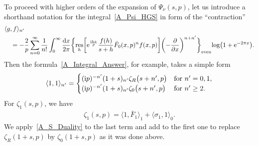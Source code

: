 \documentclass[pdftex]{sigma}
\numberwithin{equation}{section}
\DeclareMathOperator{\res}{res}
\begin{document}
To proceed with higher orders of the expansion of $\Psi_\nu(s, p)$, let us introduce a shorthand notation for the integral~\eqref{A_Psi_HGS} in form of the ``contraction''
\begin{align*}%
&\langle g, f \rangle_{n'} \\
&\quad{}=-\frac{2}{p} \sum_{n=0}^{\infty} \frac{1}{n!} \int_{0}^{\infty} \frac{{\rm d}x}{2\pi}
    \biggl\{
        \res_h\biggl[{\rm e}^{\frac{{\rm i}hx}{p}} \frac{f(h)}{s+h} \bar{F}_0(x, p)^n f(x, p)\biggr]
        \biggl(-\frac{\partial}{\partial x}\biggr)^{n+n'}
    \biggr\}_{\text{even}} \!\log\bigl(1+{\rm e}^{-2\pi x}\bigr). \nonumber
\end{align*}
Then the formula~\eqref{A_Integral_Answer}, for example, takes a simple form
\begin{align*}
\langle 1, 1 \rangle_{n'} =
\begin{cases}
({\rm i}p)^{-n'} (1+s)_{n'} \zeta_{R}\bigl(s+n', p\bigr) & \text{for } n'=0, 1, \\
({\rm i}p)^{-n'} (1+s)_{n'} \zeta_{0}\bigl(s+n', p\bigr) & \text{for } n'\geq 2.
\end{cases}
\end{align*}
For $\zeta_1(s, p)$, we have
\begin{align*}
\zeta_1(s, p)=\bigl\langle 1, \bar{F}_1\bigr\rangle_1 + \langle \sigma_1, 1 \rangle_0.
\end{align*}
We apply~\eqref{A_S_Duality} to the last term and add to the first one to replace $\zeta_R(1+s, p)$ by $\zeta_0(1+s, p)$ as it was done above.
\end{document}
